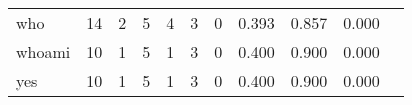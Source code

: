 \begin{longtable}{lp{1.20cm}p{1.20cm}p{1.20cm}p{1.20cm}p{1.20cm}p{1.20cm}p{1.20cm}p{1.20cm}p{1.20cm}p{1.20cm}}
who       &                                    14 &                                                  2 &                                                  5 &                                                  4 &                                                  3 &                                                  0 &                                         0.393 &                                              0.857 &                                              0.000 \\
whoami    &                                    10 &                                                  1 &                                                  5 &                                                  1 &                                                  3 &                                                  0 &                                         0.400 &                                              0.900 &                                              0.000 \\
yes       &                                    10 &                                                  1 &                                                  5 &                                                  1 &                                                  3 &                                                  0 &                                         0.400 &                                              0.900 &                                              0.000 \\
\end{longtable}

